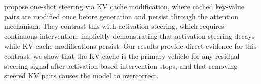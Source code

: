 \citet{belitsky2025kv} propose one-shot steering via KV cache modification, where cached key-value pairs are modified once before generation and persist through the attention mechanism. They contrast this with activation steering, which requires continuous intervention, implicitly demonstrating that activation steering decays while KV cache modifications persist. Our results provide direct evidence for this contrast: we show that the KV cache is the primary vehicle for any residual steering signal after activation-based intervention stops, and that removing steered KV pairs causes the model to overcorrect.
